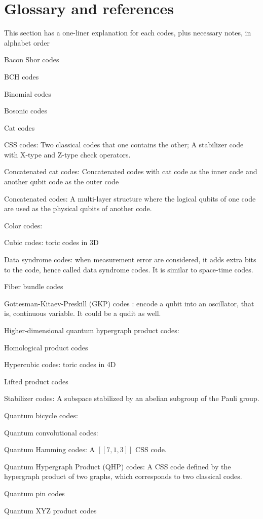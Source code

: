 \documentclass[aps,%
pra, twocolumn,%
notitlepage,longbibliography]{revtex4-2}
\begin{document}
\section{Glossary and references}
This section has a one-liner explanation for each codes, plus
necessary notes, in alphabet order


Bacon Shor codes

BCH codes

Binomial codes

Bosonic codes

Cat codes

CSS codes: Two classical codes that one contains the other; A
stabilizer code with X-type and Z-type check operators.

Concatenated cat codes: Concatenated codes with cat code as the inner
code and another qubit code as the outer code

Concatenated codes: A multi-layer structure where the logical qubits
of one code are used as the physical qubits of another code.


Color codes:

Cubic codes: toric codes in 3D

Data syndrome codes: when measurement error are considered, it adds
extra bits to the code, hence called data syndrome codes. It is
similar to space-time codes.

Fiber bundle codes

Gottesman-Kitaev-Preskill (GKP) codes \cite{gottesman2001encoding}: encode a qubit into an
oscillator, that is, continuous variable. It could be a qudit as well.


Higher-dimensional quantum hypergraph product codes:

Homological product codes

Hypercubic codes: toric codes in 4D


Lifted product codes

Stabilizer codes: A subspace stabilized by an abelian subgroup of the
Pauli group.


Quantum bicycle codes:

Quantum convolutional codes:

Quantum Hamming codes:
A $[[7,1,3]]$ CSS code.


Quantum Hypergraph Product (QHP) codes:
A CSS code defined by the hypergraph product of two graphs, which
corresponds to two classical codes.

Quantum pin codes

Quantum XYZ product codes
\end{document}
